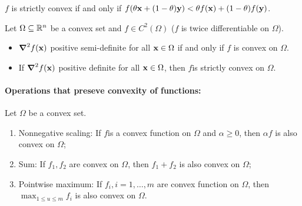 \(f\) is strictly convex if and only if \(f(\theta \mathbf{x} + (1 - \theta)\mathbf{y}) < \theta f(\mathbf{x}) + (1 - \theta)f(\mathbf{y})\).



\begin{proposition}
    Let \(\Omega \subseteq \mathbb{R}^n\) be a convex set and \(f \in C^2(\Omega)\) (\(f\) is twice differentiable on \(\Omega\)).
    \begin{itemize}
        \item \(\grad^2 f(\mathbf{x})\) positive semi-definite for all \(\mathbf{x} \in \Omega\) if and only if \(f\) is convex on \(\Omega\).
        \item If \(\grad^2 f(\mathbf{x})\) positive definite for all \(\mathbf{x} \in \Omega\), then \(f\)is strictly convex on \(\Omega\).
    \end{itemize}
\end{proposition}

\paragraph{Operations that preseve convexity of functions: } Let \(\Omega\) be a convex set.
\begin{enumerate}
    \item Nonnegative scaling: If \(f\)is a convex function on \(\Omega\) and \(\alpha \geq 0\), then \(\alpha f\) is also convex on \(\Omega\);
    \item Sum: If \(f_1, f_2\) are convex on \(\Omega\), then \(f_1 + f_2\) is also convex on \(\Omega\);
    \item Pointwise maximum: If \(f_i, i = 1, \dots, m\) are convex function on \(\Omega\), then \(\max_{1 \leq u \leq m} f_i\) is also convex on \(\Omega\).
\end{enumerate}

